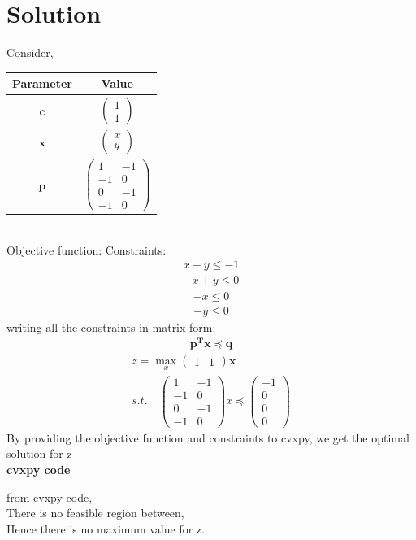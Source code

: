 \documentclass[10pt, a4paper]{article}
\newcommand{\myvec}[1]{\ensuremath{\begin{pmatrix}#1\end{pmatrix}}}
\let\vec\mathbf
\begin{document}
\section{Solution}
Consider,
\begin{tabular}{|c|c|}
	\hline
	\textbf{Parameter}&\textbf{Value}\\
	\hline
	$\vec{c}$ & $\myvec{1\\1}$ \\
	\hline
	$\vec{x}$ & $\myvec{x\\y}$ \\
	\hline
	$\vec{p}$ & $\myvec{1&-1 \\ -1&0 \\ 0&-1 \\ -1&0}$ \\
	\hline
\end{tabular}\\

Objective function:
Constraints:
\begin{align}
x - y\le -1
\end{align}
\begin{align}
-x + y \le 0
\end{align}
\begin{align}
-x \le 0
\end{align}
\begin{align}
-y \le 0
\end{align}
writing all the constraints in matrix form:
\begin{align}
\vec{p^T}\vec{x} \preceq \vec{q}
\end{align}
\fi
\begin{align}
	z = \max_{x}\myvec{1 & 1}\vec{x}
	\\
	s.t. \quad
\myvec{1&-1 \\ -1&0 \\ 0&-1 \\ -1&0}x \preceq \myvec{-1 \\ 0 \\ 0 \\ 0 }
\end{align}
\iffalse
By providing the objective function and constraints to cvxpy, we get the optimal solution for z
\\
\textbf{cvxpy code}

from cvxpy code,\\
There is no feasible region between,\\
Hence there is no maximum value for z.
\end{document}
